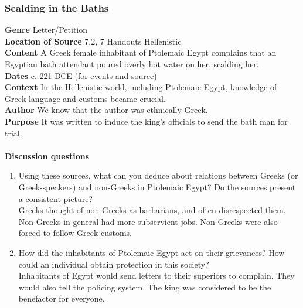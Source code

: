 \documentclass{article}
\begin{document}
\subsubsection*{Scalding in the Baths}
\textbf{Genre}
Letter/Petition \\
\textbf{Location of Source}
7.2, 7 Handouts Hellenistic \\
\textbf{Content}
A Greek female inhabitant of Ptolemaic Egypt complains that an Egyptian bath attendant
poured overly hot water on her, scalding her. \\
\textbf{Dates}
c. 221 BCE (for events and source) \\
\textbf{Context}
In the Hellenistic world, including Ptolemaic Egypt, knowledge of Greek language and
customs became crucial. \\
\textbf{Author}
We know that the author was ethnically Greek. \\
\textbf{Purpose}
It was written to induce the king’s officials to send the bath man for trial. \\
\\
\textbf{Discussion questions}
\begin{enumerate}
  \item Using these sources, what can you deduce about relations between Greeks (or
  Greek-speakers) and non-Greeks in Ptolemaic Egypt? Do the sources present a consistent picture? \\
  Greeks thought of non-Greeks as barbarians, and often disrespected them. Non-Greeks in
  general had more subservient jobs. Non-Greeks were also forced to follow Greek customs.
  \item How did the inhabitants of Ptolemaic Egypt act on their grievances? How could an
  individual obtain protection in this society? \\
  Inhabitants of Egypt would send letters to their superiors to complain. They would also tell
  the policing system. The king was considered to be the benefactor for everyone.
\end{enumerate}
\end{document}
